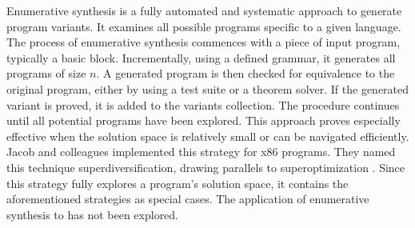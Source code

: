 
\begin{strategy}
    \label{enumerative_synthesis}
    Enumerative synthesis is a fully automated and systematic approach to generate program variants.
    It examines all possible programs specific to a given language.
    The process of enumerative synthesis commences with a piece of input program, typically a basic block.
    Incrementally, using a defined grammar, it generates all programs of size $n$.
    A generated program is then checked for equivalence to the original program, either by using a test suite or a theorem solver.
    If the generated variant is proved, it is added to the variants collection.
    The procedure continues until all potential programs have been explored.
    This approach proves especially effective when the solution space is relatively small or can be navigated efficiently.
    Jacob and colleagues \cite{jacob2008superdiversifier} implemented this strategy for x86 programs.
    They named this technique superdiversification, drawing parallels to superoptimization \cite{Massalin1987}.
    Since this strategy fully explores a program's solution space, it contains the aforementioned strategies as special cases.
    The application of enumerative synthesis to \Wasm has not been explored. 
\end{strategy}


